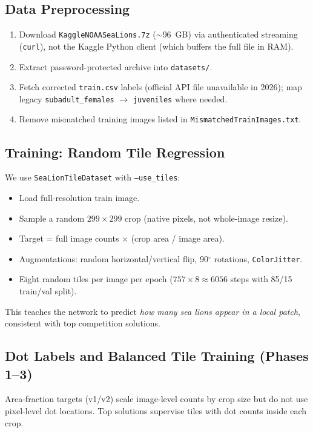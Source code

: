 \documentclass[12pt, a4paper]{article}
\begin{document}
\subsection{Data Preprocessing}
\begin{enumerate}
    \item Download \texttt{KaggleNOAASeaLions.7z} ($\sim$96~GB) via authenticated streaming (\texttt{curl}), not the Kaggle Python client (which buffers the full file in RAM).
    \item Extract password-protected archive into \texttt{datasets/}.
    \item Fetch corrected \texttt{train.csv} labels (official API file unavailable in 2026); map legacy \texttt{subadult\_females} $\rightarrow$ \texttt{juveniles} where needed.
    \item Remove mismatched training images listed in \texttt{MismatchedTrainImages.txt}.
\end{enumerate}

\subsection{Training: Random Tile Regression}
We use \texttt{SeaLionTileDataset} with \texttt{--use\_tiles}:
\begin{itemize}
    \item Load full-resolution train image.
    \item Sample a random $299\times299$ crop (native pixels, not whole-image resize).
    \item Target = full image counts $\times$ (crop area / image area).
    \item Augmentations: random horizontal/vertical flip, 90$^\circ$ rotations, \texttt{ColorJitter}.
    \item Eight random tiles per image per epoch ($757 \times 8 \approx 6056$ steps with 85/15 train/val split).
\end{itemize}

This teaches the network to predict \emph{how many sea lions appear in a local patch}, consistent with top competition solutions.

\subsection{Dot Labels and Balanced Tile Training (Phases 1--3)}
Area-fraction targets (v1/v2) scale image-level counts by crop size but do not use pixel-level dot locations. Top solutions supervise tiles with dot counts inside each crop.
\end{document}
